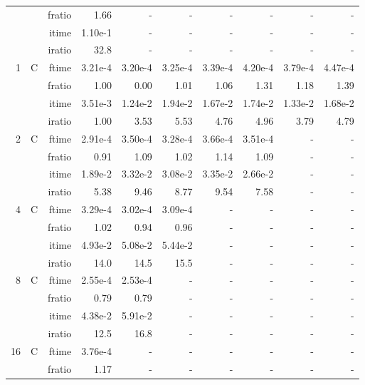\documentclass[a4paper]{article}
\begin{document}
\begin{table}[htbp]
\begin{center}
\begin{small}
\begin{tabular}{|r|r|r|r|r|r|r|r|r|r|}
           &          & fratio &   1.66 &  - &  - &  - &  - &  - &  - \\
           &          & itime &   1.10e-1 &  - &  - &  - &  - &  - &  - \\
           &          & iratio &   32.8 &  - &  - &  - &  - &  - &  - \\\hline\hline
   1 &  C &  ftime &   3.21e-4 &   3.20e-4 &   3.25e-4 &   3.39e-4 &   4.20e-4 &   3.79e-4 &   4.47e-4 \\
           &          & fratio &   1.00 &   0.00 &   1.01 &   1.06 &   1.31 &   1.18 &   1.39 \\
           &          & itime &   3.51e-3 &   1.24e-2 &   1.94e-2 &   1.67e-2 &   1.74e-2 &   1.33e-2 &   1.68e-2 \\
           &          & iratio &   1.00 &   3.53 &   5.53 &   4.76 &   4.96 &   3.79 &   4.79 \\\hline
   2 &  C &  ftime &   2.91e-4 &   3.50e-4 &   3.28e-4 &   3.66e-4 &   3.51e-4 &  - &  - \\
           &          & fratio &   0.91 &   1.09 &   1.02 &   1.14 &   1.09 &  - &  - \\
           &          & itime &   1.89e-2 &   3.32e-2 &   3.08e-2 &   3.35e-2 &   2.66e-2 &  - &  - \\
           &          & iratio &   5.38 &   9.46 &   8.77 &   9.54 &   7.58 &  - &  - \\\hline
   4 &  C &  ftime &   3.29e-4 &   3.02e-4 &   3.09e-4 &  - &  - &  - &  - \\
           &          & fratio &   1.02 &   0.94 &   0.96 &  - &  - &  - &  - \\
           &          & itime &   4.93e-2 &   5.08e-2 &   5.44e-2 &  - &  - &  - &  - \\
           &          & iratio &   14.0 &   14.5 &   15.5 &  - &  - &  - &  - \\\hline
   8 &  C &  ftime &   2.55e-4 &   2.53e-4 &  - &  - &  - &  - &  - \\
           &          & fratio &   0.79 &   0.79 &  - &  - &  - &  - &  - \\
           &          & itime &   4.38e-2 &   5.91e-2 &  - &  - &  - &  - &  - \\
           &          & iratio &   12.5 &   16.8 &  - &  - &  - &  - &  - \\\hline
   16 & C &  ftime &   3.76e-4 &  - &  - &  - &  - &  - &  - \\
           &          & fratio &   1.17 &  - &  - &  - &  - &  - &  - \\

\end{tabular}
\end{small}
\end{center}
\end{table}
\end{document}
